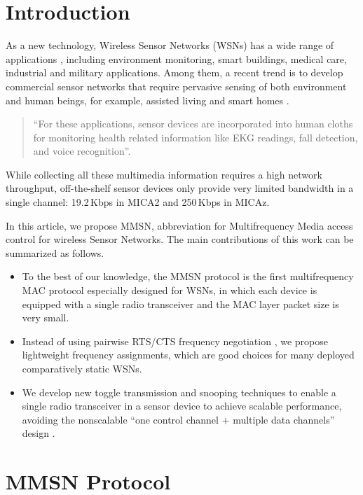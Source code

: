 \section{Introduction}


As a new technology, Wireless Sensor Networks (WSNs) has a wide
range of applications \cite{Akyildiz-01, Bahl-02, Culler-01}, including
environment monitoring, smart buildings, medical care, industrial and
military applications. Among them, a recent trend is to develop
commercial sensor networks that require pervasive sensing of both
environment and human beings, for example, assisted living
\cite{Akyildiz-02,CROSSBOW,Harvard-01} and smart homes
\cite{Adya-01, CROSSBOW, Harvard-01}.
\begin{quote}
  ``For these applications, sensor devices are incorporated into human
  cloths \cite{Adya-01, Bahl-02, Natarajan-01, Zhou-06} for monitoring
  health related information like EKG readings, fall detection, and
  voice recognition''.
\end{quote}
While collecting all these multimedia information
\cite{Akyildiz-02} requires a high network throughput, off-the-shelf
sensor devices only provide very limited bandwidth in a single
channel: 19.2\,Kbps in MICA2 \cite{Bahl-02} and 250\,Kbps in MICAz.

In this article, we propose MMSN, abbreviation for Multifrequency
Media access control for wireless Sensor Networks. The main
contributions of this work can be summarized as follows.
\begin{itemize}
\item To the best of our knowledge, the MMSN protocol is the first
multifrequency MAC protocol especially designed for WSNs, in which
each device is equipped with a single radio transceiver and
the MAC layer packet size is very small.
\item Instead of using pairwise RTS/CTS frequency negotiation
\cite{Tzamaloukas-01, Adya-01, Culler-01, Zhou-06},
we propose lightweight frequency assignments, which are good choices
for many deployed comparatively static WSNs.
\item We develop new toggle transmission and snooping techniques to
enable a single radio transceiver in a sensor device to achieve
scalable performance, avoiding the nonscalable ``one
control channel + multiple data channels'' design \cite{Natarajan-01}.
\end{itemize}

\section{MMSN Protocol}

